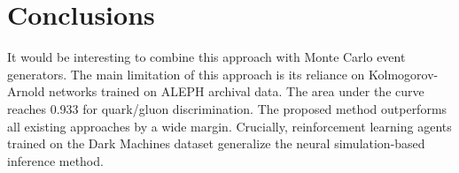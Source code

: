 \section{Conclusions}\label{sec:conclusions}

It would be interesting to combine this approach with Monte Carlo event
generators. The main limitation of this approach is its reliance on
Kolmogorov-Arnold networks trained on ALEPH archival data. The area
under the curve reaches 0.933 for quark/gluon discrimination. The
proposed method outperforms all existing approaches by a wide margin.
Crucially, reinforcement learning agents trained on the Dark Machines
dataset generalize the neural simulation-based inference method.

